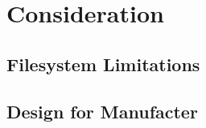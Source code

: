 
\chapter{Consideration} %


\section{Filesystem Limitations}








\section{Design for Manufacter}



